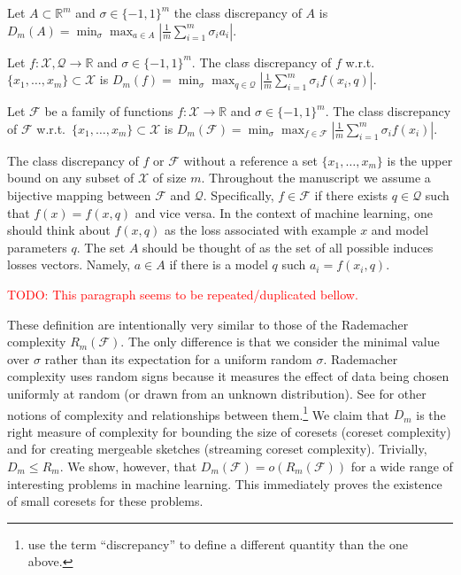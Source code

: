 \documentclass[anon,12pt]{colt2019} %
\newcommand{\todo}[1]{\textcolor{red}{TODO: #1}}
\newcommand{\R}{\mathbb{R}}
\newcommand{\F}{\mathcal{F}}
\newcommand{\X}{\mathcal{X}}
\newcommand{\Q}{\mathcal{Q}}
\begin{document}
\begin{definition} \label{cd1}
Let $A \subset \R^m$ and $\sigma \in \{-1,1\}^m$ the class discrepancy of $A$ is 
$
D_m(A)  = \min_\sigma \max_{a\in A} \left| \frac{1}{m} \sum_{i=1}^{m}  \sigma_i  a_i\right| 
$.
\end{definition}
%
\begin{definition}\label{cd2}
Let $f:\X,\Q\rightarrow\R$ and $\sigma \in \{-1,1\}^m$. 
The class discrepancy of $f$ w.r.t.\ $\{x_1,\ldots,x_m\} \subset \X$ is 
$
D_m(f) =  \min_{\sigma} \max_{q \in \Q}  \left|\frac{1}{m} \sum_{i=1}^{m}\sigma_i f(x_i,q)\right|
$.
\end{definition}
%
\begin{definition}\label{cd3}
Let $\F$ be a family of functions $f:\X\rightarrow\R$ and $\sigma \in \{-1,1\}^m$. 
The class discrepancy of $\F$ w.r.t.\ $\{x_1,\ldots,x_m\} \subset \X$ is 
$
D_m(\F) =  \min_{\sigma} \max_{f \in \F}  \left| \frac{1}{m} \sum_{i=1}^{m}\sigma_i f(x_i)\right|
$.
\end{definition}
The class discrepancy of $f$ or $\F$ without a reference a set $\{x_1,\ldots,x_m\}$ is the upper bound on any subset of $\X$ of size $m$.
Throughout the manuscript we assume a bijective mapping between $\F$ and $\Q$. 
Specifically, $f \in \F$ if there exists $q \in \Q$ such that $f(x) = f(x,q)$ and vice versa. 
In the context of machine learning, one should think about $f(x,q)$ as the loss associated with example $x$ and model parameters $q$.
The set $A$ should be thought of as the set of all possible induces losses vectors. 
Namely, $a\in A$ if there is a model $q$ such $a_i = f(x_i,q)$.

\todo{This paragraph seems to be repeated/duplicated bellow.}

These definition are intentionally very similar to those of the Rademacher complexity $R_m(\F)$.
The only difference is that we consider the minimal value over $\sigma$ rather than its expectation for a uniform random $\sigma$.
Rademacher complexity uses random signs because it measures the effect of data being chosen uniformly at random (or drawn from an unknown distribution). See \cite{Bartlett:2003:RGC:944919.944944} for other notions of complexity and relationships between them.\footnote{\cite{Bartlett:2003:RGC:944919.944944} use the term ``discrepancy'' to define a different quantity than the one above.}
We claim that $D_m$ is the right measure of complexity for bounding the size of coresets (coreset complexity) and for creating mergeable sketches (streaming coreset complexity).
Trivially,  $D_m \le R_m$. 
We show, however, that $D_m(\F) = o(R_m(\F))$ for a wide range of interesting problems in machine learning.
This immediately proves the existence of small coresets for these problems. 
\end{document}
